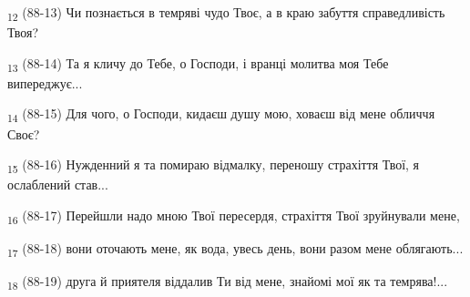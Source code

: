 \begin{tcolorbox}
\textsubscript{12} (88-13) Чи познається в темряві чудо Твоє, а в краю забуття справедливість Твоя?
\end{tcolorbox}
\begin{tcolorbox}
\textsubscript{13} (88-14) Та я кличу до Тебе, о Господи, і вранці молитва моя Тебе випереджує...
\end{tcolorbox}
\begin{tcolorbox}
\textsubscript{14} (88-15) Для чого, о Господи, кидаєш душу мою, ховаєш від мене обличчя Своє?
\end{tcolorbox}
\begin{tcolorbox}
\textsubscript{15} (88-16) Нужденний я та помираю відмалку, переношу страхіття Твої, я ослаблений став...
\end{tcolorbox}
\begin{tcolorbox}
\textsubscript{16} (88-17) Перейшли надо мною Твої пересердя, страхіття Твої зруйнували мене,
\end{tcolorbox}
\begin{tcolorbox}
\textsubscript{17} (88-18) вони оточають мене, як вода, увесь день, вони разом мене облягають...
\end{tcolorbox}
\begin{tcolorbox}
\textsubscript{18} (88-19) друга й приятеля віддалив Ти від мене, знайомі мої як та темрява!...
\end{tcolorbox}
